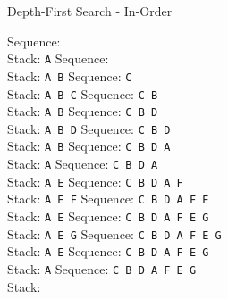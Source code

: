 \begin{frame}{Depth-First Search - In-Order}
{\bigskip
\begin{overprint}
Sequence: \\
Stack: \alert{\texttt{A}}
Sequence: \\
Stack: \alert{\texttt{A  B}}
Sequence: \alert{\texttt{C}}\\
Stack: \alert{\texttt{A  B  C}}
Sequence: \alert{\texttt{C  B}}\\
Stack: \alert{\texttt{A  B}}
Sequence: \alert{\texttt{C  B  D}}\\
Stack: \alert{\texttt{A  B  D}}
Sequence: \alert{\texttt{C  B  D}}\\
Stack: \alert{\texttt{A  B}}
Sequence: \alert{\texttt{C  B  D  A}}\\
Stack: \alert{\texttt{A}}
Sequence: \alert{\texttt{C  B  D  A}}\\
Stack: \alert{\texttt{A  E}}
Sequence: \alert{\texttt{C  B  D  A  F}}\\
Stack: \alert{\texttt{A  E  F}}
Sequence: \alert{\texttt{C  B  D  A  F  E}}\\
Stack: \alert{\texttt{A  E}}
Sequence: \alert{\texttt{C  B  D  A  F  E  G}}\\
Stack: \alert{\texttt{A  E  G}}
Sequence: \alert{\texttt{C  B  D  A  F  E  G}}\\
Stack: \alert{\texttt{A  E}}
Sequence: \alert{\texttt{C  B  D  A  F  E  G}}\\
Stack: \alert{\texttt{A}}
Sequence: \alert{\texttt{C  B  D  A  F  E  G}}\\
Stack: 
\end{overprint}
}
\end{frame}


